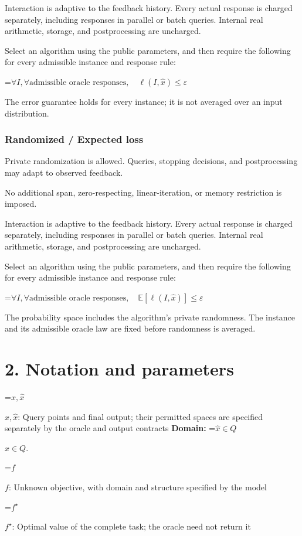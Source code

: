 \documentclass[10pt,a4paper]{article}
\newcommand{\AtlasMath}[1]{\par\begingroup\centering\setbox0=\hbox{$\displaystyle #1$}\ifdim\wd0>1.4\linewidth\typeout{ATLAS WIDE FORMULA: \the\wd0}\fi\ifdim\wd0>\linewidth\resizebox{\linewidth}{!}{\box0}\else\box0\fi\par\endgroup}
\newcommand{\AtlasInlineMath}[1]{\begingroup\setbox0=\hbox{$#1$}\ifdim\wd0>.4\linewidth\endgroup\AtlasMath{#1}\else\endgroup$#1$\fi}
\begin{document}
Interaction is adaptive to the feedback history. Every actual response is charged separately, including responses in parallel or batch queries. Internal real arithmetic, storage, and postprocessing are uncharged.

Select an algorithm using the public parameters, and then require the following for every admissible instance and response rule:


\AtlasMath{\forall I,\forall\text{admissible oracle responses},\quad\ell(I,\widehat{x})\le\varepsilon}


The error guarantee holds for every instance; it is not averaged over an input distribution.

\subsubsection{Randomized / Expected loss}
Private randomization is allowed. Queries, stopping decisions, and postprocessing may adapt to observed feedback.

No additional span, zero-respecting, linear-iteration, or memory restriction is imposed.

Interaction is adaptive to the feedback history. Every actual response is charged separately, including responses in parallel or batch queries. Internal real arithmetic, storage, and postprocessing are uncharged.

Select an algorithm using the public parameters, and then require the following for every admissible instance and response rule:


\AtlasMath{\forall I,\forall\text{admissible oracle responses},\quad\mathbb{E}[\ell(I,\widehat{x})]\le\varepsilon}


The probability space includes the algorithm's private randomness. The instance and its admissible oracle law are fixed before randomness is averaged.

\section{2. Notation and parameters}
\AtlasInlineMath{x,\widehat{x}}: Query points and final output; their permitted spaces are specified separately by the oracle and output contracts \textbf{Domain:} \AtlasInlineMath{\widehat{x}\in Q}.

\AtlasInlineMath{f}: Unknown objective, with domain and structure specified by the model

\AtlasInlineMath{f^\star}: Optimal value of the complete task; the oracle need not return it
\end{document}
